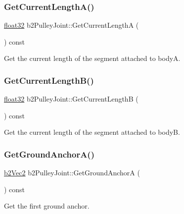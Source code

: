 \subsubsection{\texorpdfstring{GetCurrentLengthA()}{GetCurrentLengthA()}}
{\footnotesize\ttfamily \mbox{\hyperlink{b2_settings_8h_aacdc525d6f7bddb3ae95d5c311bd06a1}{float32}} b2\+Pulley\+Joint\+::\+Get\+Current\+LengthA (\begin{DoxyParamCaption}{ }\end{DoxyParamCaption}) const}



Get the current length of the segment attached to bodyA. 

\mbox{\label{classb2_pulley_joint_aa2d15dc26b2df0a446ccda652058085d}} 
\subsubsection{\texorpdfstring{GetCurrentLengthB()}{GetCurrentLengthB()}}
{\footnotesize\ttfamily \mbox{\hyperlink{b2_settings_8h_aacdc525d6f7bddb3ae95d5c311bd06a1}{float32}} b2\+Pulley\+Joint\+::\+Get\+Current\+LengthB (\begin{DoxyParamCaption}{ }\end{DoxyParamCaption}) const}



Get the current length of the segment attached to bodyB. 

\mbox{\label{classb2_pulley_joint_a082db0a3ab20f682b9c7d5f41f0cc79e}} 
\subsubsection{\texorpdfstring{GetGroundAnchorA()}{GetGroundAnchorA()}}
{\footnotesize\ttfamily \mbox{\hyperlink{structb2_vec2}{b2\+Vec2}} b2\+Pulley\+Joint\+::\+Get\+Ground\+AnchorA (\begin{DoxyParamCaption}{ }\end{DoxyParamCaption}) const}



Get the first ground anchor. 

